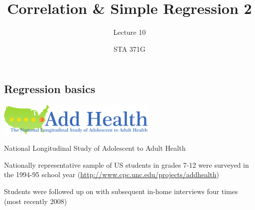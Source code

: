 \documentclass{beamer}\usepackage[]{graphicx}\usepackage[]{color}
\title{Correlation \& Simple Regression 2}
\subtitle{Lecture 10}
\author{STA 371G}
\begin{document}
  
  
  

  \frame{\maketitle}



  \begin{darkframes}
    \section{Regression basics}

    \begin{frame}
      \begin{center}
        \includegraphics[width=3in]{add-health}

        \bigskip
        National Longitudinal Study of Adolescent to Adult Health

        \bigskip
        Nationally representative sample of US students in grades 7-12 were surveyed in the 1994-95 school year (\url{http://www.cpc.unc.edu/projects/addhealth})

        \bigskip
        Students were followed up on with subsequent in-home interviews four times (most recently 2008)
      \end{center}
    \end{frame}


\end{darkframes}
\end{document}
